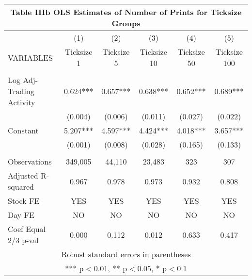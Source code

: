 \documentclass[]{article}
\begin{document}
\begin{tabular}{lccccc}
\multicolumn{6}{c}{Table IIIb OLS Estimates of Number of Prints for Ticksize Groups} \\ \hline
 & (1) & (2) & (3) & (4) & (5) \\
VARIABLES & Ticksize 1 & Ticksize 5 & Ticksize 10 & Ticksize 50 & Ticksize 100 \\ \hline
 &  &  &  &  &  \\
Log Adj-Trading Activity & 0.624*** & 0.657*** & 0.638*** & 0.652*** & 0.689*** \\
 & (0.004) & (0.006) & (0.011) & (0.027) & (0.022) \\
Constant & 5.207*** & 4.597*** & 4.424*** & 4.018*** & 3.657*** \\
 & (0.001) & (0.008) & (0.028) & (0.165) & (0.133) \\
 &  &  &  &  &  \\
Observations & 349,005 & 44,110 & 23,483 & 323 & 307 \\
Adjusted R-squared & 0.967 & 0.978 & 0.973 & 0.932 & 0.808 \\
Stock FE & YES & YES & YES & YES & YES \\
Day FE & NO & NO & NO & NO & NO \\
 Coef Equal 2/3 p-val & 0.000 & 0.112 & 0.012 & 0.633 & 0.417 \\ \hline
\multicolumn{6}{c}{ Robust standard errors in parentheses} \\
\multicolumn{6}{c}{ *** p$<$0.01, ** p$<$0.05, * p$<$0.1} \\
\end{tabular}
\end{document}
